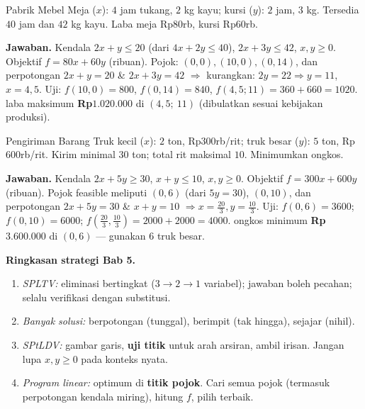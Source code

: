 \begin{studikasus}{Pabrik Mebel}
Meja ($x$): $4$ jam tukang, $2$ kg kayu; kursi ($y$): $2$ jam, $3$ kg. Tersedia
$40$ jam dan $42$ kg kayu. Laba meja Rp$80$rb, kursi Rp$60$rb.
\end{studikasus}
\textbf{Jawaban.} Kendala $2x+y\le20$ (dari $4x+2y\le40$), $2x+3y\le42$,
$x,y\ge0$. Objektif $f=80x+60y$ (ribuan). Pojok: $(0,0),(10,0),(0,14)$, dan
perpotongan $2x+y=20$ \& $2x+3y=42$ $\Rightarrow$ kurangkan: $2y=22\Rightarrow
y=11$, $x=4{,}5$. Uji: $f(10,0)=800$, $f(0,14)=840$, $f(4{,}5;11)=360+660=1020$.
\jadi laba maksimum \textbf{Rp$1.020.000$} di $(4{,}5;\ 11)$ (dibulatkan sesuai
kebijakan produksi).

\begin{studikasus}{Pengiriman Barang}
Truk kecil ($x$): $2$ ton, Rp$300$rb/rit; truk besar ($y$): $5$ ton,
Rp$600$rb/rit. Kirim minimal $30$ ton; total rit maksimal $10$. Minimumkan ongkos.
\end{studikasus}
\textbf{Jawaban.} Kendala $2x+5y\ge30$, $x+y\le10$, $x,y\ge0$. Objektif
$f=300x+600y$ (ribuan). Pojok feasible meliputi $(0,6)$ (dari $5y=30$),
$(0,10)$, dan perpotongan $2x+5y=30$ \& $x+y=10$ $\Rightarrow x=\tfrac{20}{3},
y=\tfrac{10}{3}$. Uji: $f(0,6)=3600$; $f(0,10)=6000$;
$f(\tfrac{20}{3},\tfrac{10}{3})=2000+2000=4000$.
\jadi ongkos minimum \textbf{Rp$3.600.000$} di $(0,6)$ --- gunakan $6$ truk besar.

\begin{tips}
\textbf{Ringkasan strategi Bab 5.}
\begin{enumerate}[leftmargin=*,topsep=2pt]
  \item \emph{SPLTV:} eliminasi bertingkat ($3\to2\to1$ variabel); jawaban boleh
  pecahan; selalu verifikasi dengan substitusi.
  \item \emph{Banyak solusi:} berpotongan (tunggal), berimpit (tak hingga),
  sejajar (nihil).
  \item \emph{SPtLDV:} gambar garis, \textbf{uji titik} untuk arah arsiran,
  ambil irisan. Jangan lupa $x,y\ge0$ pada konteks nyata.
  \item \emph{Program linear:} optimum di \textbf{titik pojok}. Cari semua pojok
  (termasuk perpotongan kendala miring), hitung $f$, pilih terbaik.
\end{enumerate}
\end{tips}


